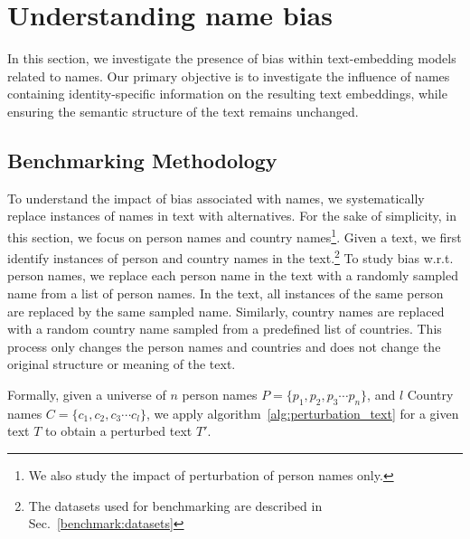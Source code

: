 \section{Understanding name bias}
\label{sec:benchmarking}
In this section, we investigate the presence of bias within text-embedding models related to names. Our primary objective is to investigate the influence of names containing identity-specific information on the resulting text embeddings, while ensuring the semantic structure of the text remains unchanged.


\subsection{Benchmarking Methodology}
To understand the impact of bias associated with names, we systematically replace instances of names in text with alternatives. For the sake of simplicity, in this section, we focus on person names and country names\footnote{We also study the impact of  perturbation of person names only.}. Given a text, we first identify instances of person and country names in the text.\footnote{The datasets used for benchmarking are described in Sec.~\ref{benchmark:datasets} } To study bias w.r.t. person names, we replace each person name in the text with a randomly sampled name from a list of person names. In the text, all instances of the same person are replaced by the same sampled name. Similarly, country names are replaced with a random country name sampled from a predefined list of countries. This process only changes the person names and countries and does not change the original structure or meaning of the text.



Formally, given a universe of $n$ person names $P=\{p_1, p_2, p_3 \cdots p_n\}$, and $l$ Country names $C=\{c_1, c_2, c_3 \cdots c_l\}$, we apply algorithm~\ref{alg:perturbation_text} for a given text $T$ to obtain a perturbed text $T'$. 

